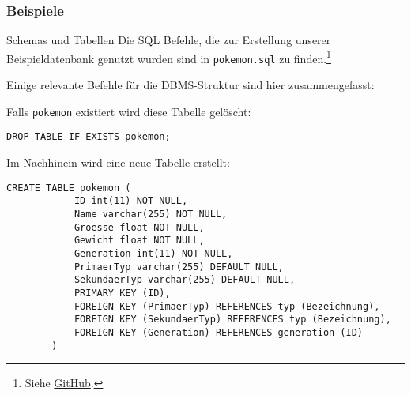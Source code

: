 \subsubsection{Beispiele}

\begin{example}{Schemas und Tabellen}
    Die SQL Befehle, die zur Erstellung unserer Beispieldatenbank genutzt wurden sind in \texttt{pokemon.sql} zu finden.\footnote{Siehe \href{https://www.github.com/pblan/matse-spicker}{GitHub}.}

    Einige relevante Befehle für die DBMS-Struktur sind hier zusammengefasst:

    Falls \texttt{pokemon} existiert wird diese Tabelle gelöscht:

    \begin{lstlisting}[language=mysql]
        DROP TABLE IF EXISTS pokemon;
    \end{lstlisting}

    Im Nachhinein wird eine neue Tabelle erstellt:

    \begin{lstlisting}[language=mysql]
        CREATE TABLE pokemon (
            ID int(11) NOT NULL,
            Name varchar(255) NOT NULL,
            Groesse float NOT NULL,
            Gewicht float NOT NULL,
            Generation int(11) NOT NULL,
            PrimaerTyp varchar(255) DEFAULT NULL,
            SekundaerTyp varchar(255) DEFAULT NULL,
            PRIMARY KEY (ID),
            FOREIGN KEY (PrimaerTyp) REFERENCES typ (Bezeichnung),
            FOREIGN KEY (SekundaerTyp) REFERENCES typ (Bezeichnung),
            FOREIGN KEY (Generation) REFERENCES generation (ID)
        )
    \end{lstlisting}
\end{example}